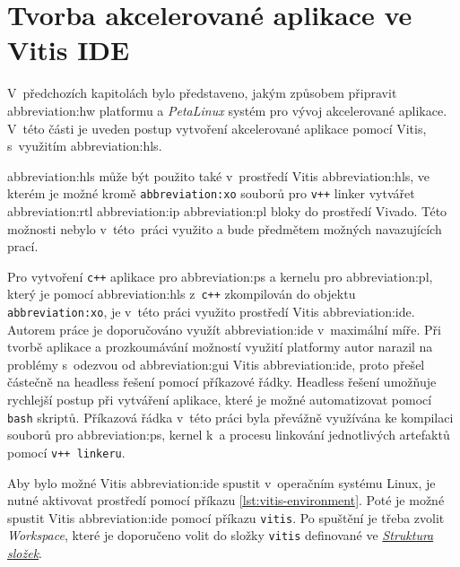 \documentclass[a4paper, twoside, 11pt]{article}
\newcommand{\fbar}{\FloatBarrier}
\begin{document}
	\section{Tvorba akcelerované aplikace ve Vitis IDE}
	V~předchozích kapitolách bylo představeno, jakým způsobem připravit \gls{abbreviation:hw} platformu a \textit{PetaLinux} systém pro vývoj akcelerované aplikace. V~této části je uveden postup vytvoření akcelerované aplikace pomocí Vitis, s~využitím \gls{abbreviation:hls}.\par
	\gls{abbreviation:hls} může být použito také v~prostředí Vitis \gls{abbreviation:hls}, ve kterém je možné kromě \texttt{\gls{abbreviation:xo}} souborů pro \texttt{v++} linker vytvářet \gls{abbreviation:rtl} \gls{abbreviation:ip} \gls{abbreviation:pl} bloky do prostředí Vivado. Této možnosti nebylo v~této~práci využito a bude předmětem možných navazujících prací.\par
	Pro vytvoření \texttt{c++} aplikace pro \gls{abbreviation:ps} a kernelu pro \gls{abbreviation:pl}, který je pomocí \gls{abbreviation:hls} z~\texttt{c++} zkompilován do objektu \texttt{\gls{abbreviation:xo}}, je v~této práci využito prostředí Vitis \gls{abbreviation:ide}. Autorem práce je doporučováno využít \gls{abbreviation:ide} v~maximální míře. Při tvorbě aplikace a prozkoumávání možností využití platformy autor narazil na problémy s~odezvou od \gls{abbreviation:gui} Vitis \gls{abbreviation:ide}, proto přešel částečně na headless řešení pomocí příkazové řádky. Headless řešení umožňuje rychlejší postup při vytváření aplikace, které je možné automatizovat pomocí \texttt{bash} skriptů. Příkazová řádka v~této práci byla převážně využívána ke kompilaci souborů pro \gls{abbreviation:ps}, kernel k~a procesu linkování jednotlivých artefaktů pomocí \texttt{v++ linkeru}.\par
	Aby bylo možné Vitis \gls{abbreviation:ide} spustit v~operačním systému Linux, je nutné aktivovat prostředí pomocí příkazu \ref{lst:vitis-environment}. Poté je možné spustit Vitis \gls{abbreviation:ide} pomocí příkazu \texttt{vitis}. Po spuštění je třeba zvolit \textit{Workspace}, které je doporučeno volit do složky \texttt{vitis} definované ve \hyperref[sec:struktura-slozek]{\textit{Struktura složek}}.\par

		\fbar
\end{document}
